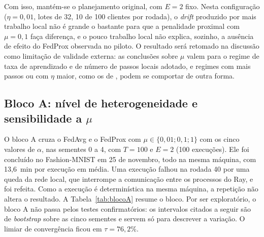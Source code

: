Com isso, mantém-se o planejamento original, com $E = 2$ fixo. Nesta configuração ($\eta = 0{,}01$, lotes de 32, 10 de 100 clientes por rodada), o \textit{drift} produzido por mais trabalho local não é grande o bastante para que a penalidade proximal com $\mu = 0{,}1$ faça diferença, e o pouco trabalho local não explica, sozinho, a ausência de efeito do FedProx observada no piloto. O resultado será retomado na discussão como limitação de validade externa: as conclusões sobre $\mu$ valem para o regime de taxa de aprendizado e de número de passos locais adotado, e regimes com mais passos ou com $\eta$ maior, como os de \citet{li2020fedprox}, podem se comportar de outra forma.

\subsection{Bloco A: nível de heterogeneidade e sensibilidade a $\mu$}
\label{sec:blocoA}

O bloco A cruza o FedAvg e o FedProx com $\mu \in \{0{,}01; 0{,}1; 1\}$ com os cinco valores de $\alpha$, nas sementes 0 a 4, com $T = 100$ e $E = 2$ (100 execuções). Ele foi concluído no Fashion-MNIST em 25 de novembro, todo na mesma máquina, com 13,6~min por execução em média. Uma execução falhou na rodada 40 por uma queda da rede local, que interrompe a comunicação entre os processos do Ray, e foi refeita. Como a execução é determinística na mesma máquina, a repetição não altera o resultado. A Tabela~\ref{tab:blocoA} resume o bloco. Por ser exploratório, o bloco A não passa pelos testes confirmatórios: os intervalos citados a seguir são de \textit{bootstrap} sobre as cinco sementes e servem só para descrever a variação. O limiar de convergência ficou em $\tau = 76{,}2\%$.

